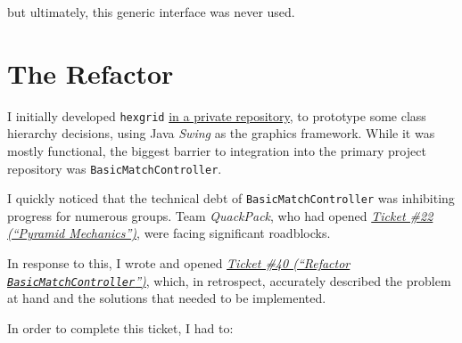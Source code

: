\documentclass[11pt,a4paper]{report}
\begin{document}
but ultimately, this generic interface was never used.


\section{The Refactor}

I initially developed \texttt{hexgrid} \href{https://github.com/MaxwellBo/HexGrid/tree/master/src}{in a private repository}, to prototype some class hierarchy decisions, using Java \textit{Swing} as the graphics framework. While it was mostly functional, the biggest barrier to integration into the primary project repository was \texttt{BasicMatchController}.

I quickly noticed that the technical debt of \texttt{BasicMatchController} was inhibiting progress for numerous groups. Team \textit{QuackPack}, who had opened \href{https://github.com/UQdeco2800/deco2800-2016-pyramidscheme/issues/22}{\textit{Ticket \#22 (``Pyramid Mechanics'')}}, were facing significant roadblocks.

In response to this, I wrote and opened \href{https://github.com/UQdeco2800/deco2800-2016-pyramidscheme/issues/40}{\textit{Ticket \#40 (``Refactor \texttt{BasicMatchController}'')}}, which, in retrospect, accurately described the problem at hand and the solutions that needed to be implemented.

In order to complete this ticket, I had to:
\end{document}
